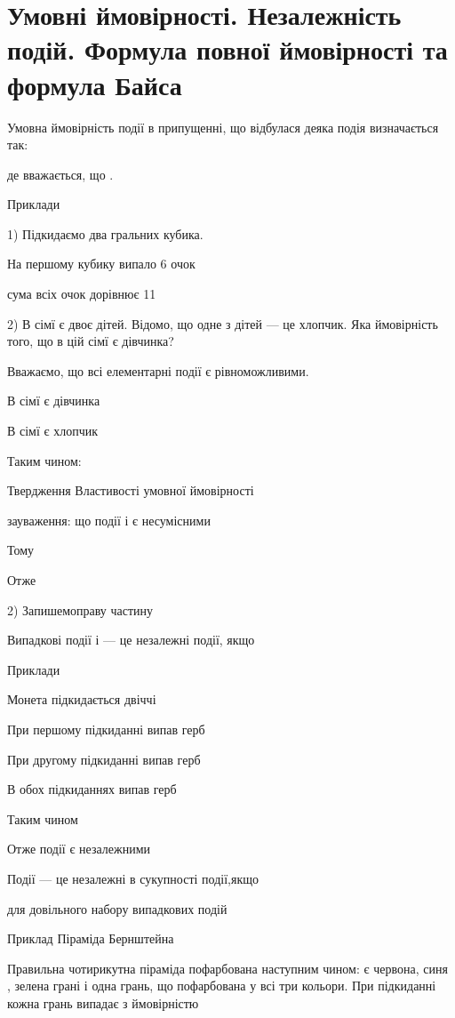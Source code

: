 \chapter{Умовні ймовірності. Незалежність подій. Формула повної ймовірності та формула Байса}

Умовна ймовірність події  в припущенні, що відбулася деяка
подія  визначається так:



де вважається, що  .

Приклади

1) Підкидаємо два гральних кубика.

На першому кубику випало 6 очок

сума всіх очок дорівнює 11



2) В сімї є двоє дітей. Відомо, що одне з дітей --- це
хлопчик. Яка ймовірність того, що в цій сімї є
дівчинка?


Вважаємо, що всі елементарні події є рівноможливими.

В сімї є дівчинка

В сімї є хлопчик


Таким чином:

Твердження Властивості умовної ймовірності


зауваження: що події  і  є несумісними 


Тому

Отже


2) Запишемоправу частину


Випадкові події  і  --- це незалежні події, якщо 


Приклади

Монета підкидається двіччі

При першому підкиданні випав герб

При другому підкиданні випав герб

В обох підкиданнях випав герб


Таким чином

Отже події  є незалежними

Події   --- це незалежні в сукупності події,якщо

для довільного набору випадкових подій


Приклад Піраміда Бернштейна

Правильна чотирикутна піраміда пофарбована наступним чином:
є червона, синя , зелена грані і одна грань, що пофарбована
у всі три кольори. При підкиданні кожна грань випадає з
ймовірністю

